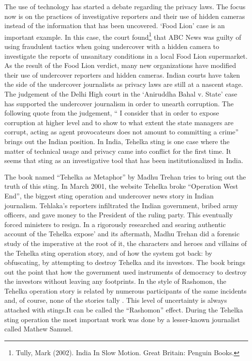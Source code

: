 \begin{multicols}{2}
\noi
The use of technology has started a debate regarding the privacy laws. The focus now is on the
practices of investigative reporters and their use of hidden cameras instead of the information
that has been uncovered. ‘Food Lion’ case is an important example. In this case, the court
found\footnote{Tully, Mark (2002). India In Slow Motion. Great Britain: Penguin Books.} that ABC News was guilty of using fraudulent tactics when going undercover with a
hidden camera to investigate the reports of unsanitary conditions in a local Food Lion
supermarket. As the result of the Food Lion verdict, many new organizations have modified
their use of undercover reporters and hidden cameras. Indian courts have taken the side of the
undercover journalists as privacy laws are still at a nascent stage. The judgement of the Delhi High court in the ‘Aniruddha Bahal v. State’ case has supported the undercover journalism in
order to unearth corruption. The following quote from the judgement, “ I consider that in order
to expose corruption at higher level and to show to what extent the state managers are corrupt,
acting as agent provocateurs does not amount to committing a crime” brings out the Indian
position. In India, Tehelka sting is one case where the matter of technical usage and privacy
came into conflict for the first time. It seems that sting as an investigative tool that has been
institutionalized in India.

\noi
The book named “Tehelka as Metaphor” by Madhu Trehan tries to bring out the truth of this
sting. In March 2001, the website Tehelka broke “Operation West End”, the biggest sting
operation and undercover news story in Indian journalism. Tehlaka’s reporters infiltrated the
Indian government, bribed army officers, and gave money to the President of the ruling party.
This eventually forced ministers to resign. In a rigorously researched and searing authentic
account of the Tehelka expose’ and its aftermath, Madhu Trehan did a forensic study of the
imperative at the root of it, the characters and heroes and villains of the Tehelka sting operation
story, and of how the system got back: by obfuscating, by attempting to destroy Tehelka and
its investors. The book brings out the point that how the government used instruments of
democracy to destroy the investors without leaving any footprints. In the style of Rashomon,
the Tehelka operation story is related by numerous participants of the same incidents and, of
course, none of the stories tally . This level of uncertainty is always attached with stings.It can
be called the “Rashomon” effect. During the Tehelka sting operation the most important work
was done by a lesser-known journalist called Mathew Samuel.


\end{multicols}
